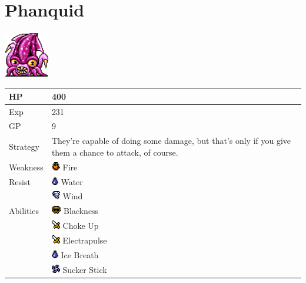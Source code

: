 \section{Phanquid}
\label{monster:phanquid}

\includegraphics[height=2cm,keepaspectratio]{./resources/monster/phanquid}

\begin{longtable}{ l p{9cm} }
	HP
	& 400
\\ \hline
	Exp
	& 231
\\ \hline
	GP
	& 9
\\ \hline
	Strategy
	& They're capable of doing some damage, but that's only if you give them a chance to attack, of course.
\\ \hline
	Weakness
	& \includegraphics[height=1em,keepaspectratio]{./resources/effects/fire} Fire
\\ \hline
	Resist
	& \includegraphics[height=1em,keepaspectratio]{./resources/effects/water} Water \\
	& \includegraphics[height=1em,keepaspectratio]{./resources/effects/wind} Wind
\\ \hline
	Abilities
	& \includegraphics[height=1em,keepaspectratio]{./resources/effects/blind} Blackness \\
	& \includegraphics[height=1em,keepaspectratio]{./resources/effects/damage} Choke Up \\
	& \includegraphics[height=1em,keepaspectratio]{./resources/effects/damage} Electrapulse \\
	& \includegraphics[height=1em,keepaspectratio]{./resources/effects/water} Ice Breath \\
	& \includegraphics[height=1em,keepaspectratio]{./resources/effects/drain} Sucker Stick
\end{longtable}
